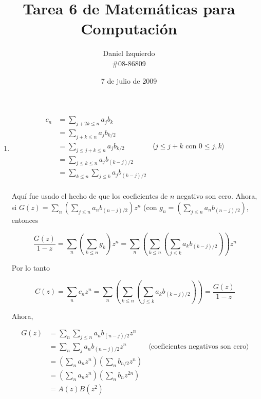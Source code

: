 \documentclass{article}
\begin{document}

\title{Tarea 6 de Matemáticas para Computación}
\author{Daniel Izquierdo \\ \#08-86809}
\date{7 de julio de 2009}

\maketitle

\section{}

\renewcommand{\labelenumi}{(\alph{enumi})}
\begin{enumerate}
 \item
 
\begin{align*}
c_n & = \sum_{j+2k \leq n} a_j b_k \\
    & = \sum_{j+k \leq n} a_j b_{k/2} \\
    & = \sum_{j \leq j+k \leq n} a_j b_{k/2} & \langle j \leq j+k \text{ con } 0 \leq j,k \rangle \\
    & = \sum_{j \leq k \leq n} a_j b_{(k-j)/2} \\
    & = \sum_{k \leq n} \sum_{j \leq k} a_j b_{(k-j)/2} \\
\end{align*}

Aquí fue usado el hecho de que los coeficientes de $n$ negativo son cero. Ahora,
si $G(z) = \sum_n (\sum_{j \leq n} a_n b_{(n-j)/2}) z^n$ (con $g_n = (\sum_{j \leq n} a_n b_{(n-j)/2})$, entonces

\[
\frac{G(z)}{1-z} = \sum_n (\sum_{k \leq n} g_k) z^n = \sum_n (\sum_{k \leq n} (\sum_{j \leq k} a_k b_{(k-j)/2})) z^n
\]

Por lo tanto

\[
C(z) = \sum_n c_n z^n = \sum_n (\sum_{k \leq n} (\sum_{j \leq k} a_k b_{(k-j)/2})) = \frac{G(z)}{1-z}
\]

Ahora,

\begin{align*}
G(z) & = \sum_n \sum_{j \leq n} a_n b_{(n-j)/2} z^n \\
     & = \sum_n \sum_{j} a_n b_{(n-j)/2} z^n & \langle \text{coeficientes negativos son cero} \rangle \\
     & = (\sum_n a_n z^n)(\sum_n b_{n/2} z^n) \\
     & = (\sum_n a_n z^n)(\sum_n b_n z^{2n}) \\
     & = A(z)B(z^2) \\
\end{align*}


\end{enumerate}
\end{document}

